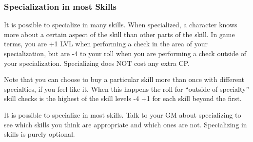 \documentclass[twoside]{book}
\begin{document}
\subsubsection{Specialization in most Skills}
     It is possible to specialize in many skills. When
                 specialized, a character knows more about a certain
                 aspect of the skill than other parts of the skill. In
                 game terms, you are +1 LVL when performing a check in
                 the area of your specialization, but are -4 to your roll
                 when you are performing a check outside of your
                 specialization. Specializing does NOT cost any extra CP.
                 
   Note that you can choose to buy a particular skill
                 more than once with different specialties, if you feel
                 like it. When this happens the roll for “outside
                 of specialty” skill checks is the highest of the
                 skill levels -4 +1 for each skill beyond the first.
                 
   It is possible to specialize in most skills. Talk
                 to your GM about specializing to see which skills you
                 think are appropriate and which ones are not.  Specializing in skills is purely optional. 
\end{document}
